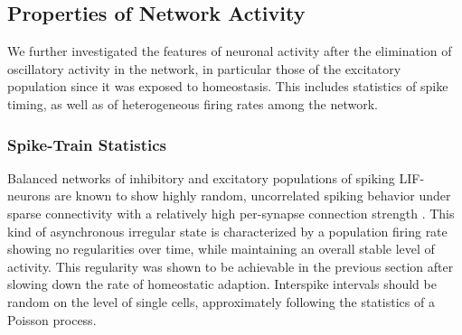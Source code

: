 \documentclass[10pt,a4paper]{article}
\begin{document}
\subsection{Properties of Network Activity}

We further investigated the features of neuronal activity after the elimination of oscillatory activity in the network, in particular those of the excitatory population since it was exposed to homeostasis. This includes statistics of spike timing, as well as of heterogeneous firing rates among the network.  

\subsubsection{Spike-Train Statistics}
Balanced networks of inhibitory and excitatory populations of spiking LIF-neurons are known to show highly random, uncorrelated spiking behavior under sparse connectivity with a relatively high per-synapse connection strength \cite{Vreeswijk1996,Brunel2000}. This kind of asynchronous irregular state is characterized by a population firing rate showing no regularities over time, while maintaining an overall stable level of activity. This regularity was shown to be achievable in the previous section after slowing down the rate of homeostatic adaption. Interspike intervals should be random on the level of single cells, approximately following the statistics of a Poisson process.   
\end{document}
